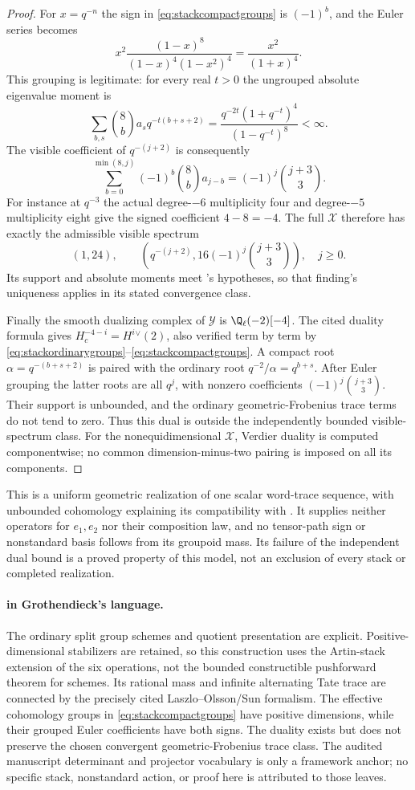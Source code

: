 \begin{proof}
For $x=q^{-n}$ the sign in \eqref{eq:stackcompactgroups} is
$(-1)^b$, and the Euler series becomes
\[
 x^2\frac{(1-x)^8}{(1-x)^4(1-x^2)^4}
 =\frac{x^2}{(1+x)^4}.
\]
This grouping is legitimate: for every real $t>0$ the ungrouped
absolute eigenvalue moment is
\[
 \sum_{b,s}\binom8b a_s q^{-t(b+s+2)}
 =\frac{q^{-2t}(1+q^{-t})^4}{(1-q^{-t})^8}<\infty.
\]
The visible coefficient of $q^{-(j+2)}$ is consequently
\[
 \sum_{b=0}^{\min(8,j)}(-1)^b\binom8b a_{j-b}
   =(-1)^j\binom{j+3}{3}.
\]
For instance at $q^{-3}$ the actual degree-$-6$ multiplicity four
and degree-$-5$ multiplicity eight give the signed coefficient
$4-8=-4$. The full $\mathcal X$ therefore has exactly the
admissible visible spectrum
\[
 (1,24),\qquad
 \left(q^{-(j+2)},16(-1)^j\binom{j+3}{3}\right),\quad j\ge0.
\]
Its support and absolute moments meet 's hypotheses, so
that finding's uniqueness applies in its stated convergence class.

Finally the smooth dualizing complex of $\mathcal Y$ is
$\Q_\ell(-2)[-4]$. The cited duality formula gives
$H_c^{-4-i}=H^i{}^\vee(2)$, also verified term by term by
\eqref{eq:stackordinarygroups}--\eqref{eq:stackcompactgroups}.
A compact root $\alpha=q^{-(b+s+2)}$ is paired with the
ordinary root $q^{-2}/\alpha=q^{b+s}$. After Euler grouping
the latter roots are all $q^j$, with nonzero coefficients
$(-1)^j\binom{j+3}{3}$. Their support is unbounded, and the
ordinary geometric-Frobenius trace terms do not tend to zero.
Thus this dual is outside the independently bounded visible-spectrum
class. For the nonequidimensional $\mathcal X$, Verdier duality
is computed componentwise; no common dimension-minus-two pairing
is imposed on all its components.
\end{proof}

This is a uniform geometric realization of one scalar word-trace
sequence, with unbounded cohomology explaining its compatibility
with . It supplies neither operators for $e_1,e_2$ nor
their composition law, and no tensor-path sign or nonstandard basis
follows from its groupoid mass. Its failure of the independent dual
bound is a proved property of this model, not an exclusion of every
stack or completed realization.

\paragraph{ in Grothendieck's language.}
The ordinary split group schemes and quotient presentation are
explicit. Positive-dimensional stabilizers are retained, so this
construction uses the Artin-stack extension of the six operations,
not the bounded constructible pushforward theorem for schemes.
Its rational mass and infinite alternating Tate trace are connected
by the precisely cited Laszlo--Olsson/Sun formalism. The effective
cohomology groups in \eqref{eq:stackcompactgroups} have positive
dimensions, while their grouped Euler coefficients have both signs.
The duality exists but does not preserve the chosen convergent
geometric-Frobenius trace class. The audited manuscript determinant
and projector vocabulary is only a framework anchor; no specific
stack, nonstandard action, or proof here is attributed to those leaves.

